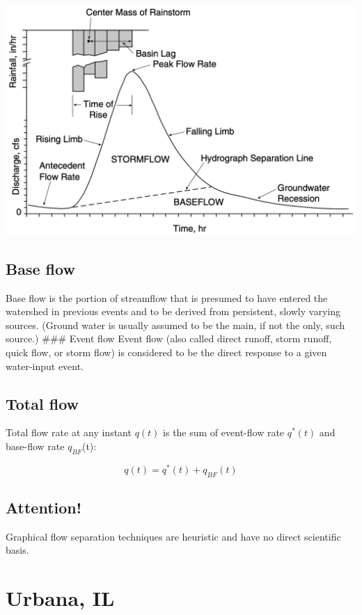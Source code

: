 \documentclass[
  letterpaper,
  DIV=11,
  numbers=noendperiod]{scrreprt}
\begin{document}
\includegraphics{archive/figures/ward-figure5.11.png}

\hypertarget{base-flow}{%
\subsection{Base flow}\label{base-flow}}

Base flow is the portion of streamflow that is presumed to have entered
the watershed in previous events and to be derived from persistent,
slowly varying sources. (Ground water is usually assumed to be the main,
if not the only, such source.) \#\#\# Event flow Event flow (also called
direct runoff, storm runoff, quick flow, or storm flow) is considered to
be the direct response to a given water-input event.

\hypertarget{total-flow}{%
\subsection{Total flow}\label{total-flow}}

Total flow rate at any instant \(q(t)\) is the sum of event-flow rate
\(q^*(t)\) and base-flow rate \(q_{BF}\)(t):

\[
q(t) = q^*(t) + q_{BF}(t)
\]

\hypertarget{attention}{%
\subsection{Attention!}\label{attention}}

Graphical flow separation techniques are heuristic and have no direct
scientific basis.

\hypertarget{urbana-il}{%
\section{Urbana, IL}\label{urbana-il}}
\end{document}
